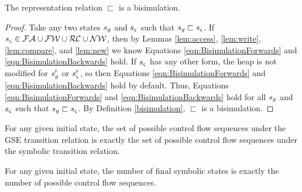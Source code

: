 %
%
%
%

\begin{theorem}
\label{th:bisim}
The representation relation $\sqsubset$ is a bisimulation.
\end{theorem}

\begin{proof}
Take any two states $s_{g}$ and $s_{\varsigma}$ such that $s_{g} \sqsubset s_{\varsigma}$. If $s_{\varsigma} \in \mathcal{FA} \cup \mathcal{FW} \cup \mathcal{RC} \cup \mathcal{NW}$, then by Lemmas \ref{lem:access}, \ref{lem:write}, \ref{lem:compare}, and \ref{lem:new} we know Equations \ref{eqn:BisimulationForwards} and \ref{eqn:BisimulationBackwards} hold. If $s_{\varsigma}$ has any other form, the heap is not modified for $s_{g}^\prime$ or $s_{\varsigma}^\prime$, so then Equations \ref{eqn:BisimulationForwards} and \ref{eqn:BisimulationBackwards} hold by default. Thus, Equations \ref{eqn:BisimulationForwards} and \ref{eqn:BisimulationBackwards} hold for all  $s_{g}$ and $s_{\varsigma}$ such that $s_{g} \sqsubset s_{\varsigma}$. By Definition \ref{bisimulation}, $\sqsubset$ is a bisimulation.

\end{proof}

\begin{corollary}
For any given initial state, the set of possible control flow sequences under the GSE transition relation is exactly the set of possible control flow sequences under the symbolic transition relation.
\end{corollary}

\begin{corollary}
For any given initial state, the number of final symbolic states is exactly the number of possible control flow sequences.
\end{corollary}


